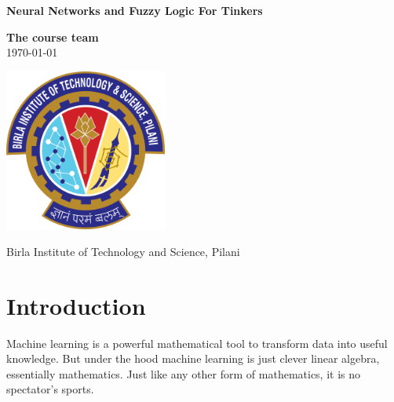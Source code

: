 \documentclass{article} %
\begin{document}
\begin{titlepage}
    \begin{center}
        \vspace*{1cm}

        \begin{huge}
            \textbf{Neural Networks and Fuzzy Logic For Tinkers}
        \end{huge}

        \vspace{4cm}

        \textbf{The course team}\\
        \today

        \vspace{2.5cm}

        \includegraphics[width=0.4\textwidth]{logo}
        \vspace{1cm}

        Birla Institute of Technology and Science, Pilani\\
        \vspace{0.5cm}
    \end{center}
\end{titlepage}


\tableofcontents

\vspace{10cm}

\section{Introduction}

Machine learning is a powerful mathematical tool to transform data
into useful knowledge. But under the hood machine learning is
just clever linear algebra, essentially mathematics. Just like any other
form of mathematics, it is no spectator's sports.
\end{document}
